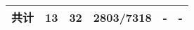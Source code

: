 \begin{table}[!h]
{\begin{tabular}{c|c|c|c|cccccc|l}
     \\
    \midrule[0.7pt]
    \textbf{共计} & \textbf{13} & \textbf{32} & \textbf{2803/7318} & \multicolumn{6}{l|}{-}  & -  \\
    \bottomrule[0.7pt]
    
    \end{tabular}
    }
     \label{table5-2}
\end{table}
    
    